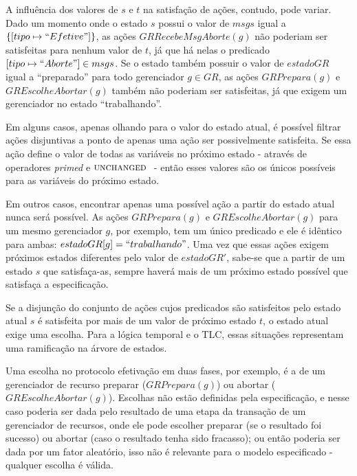 A influência dos valores de $s$ e $t$ na satisfação de ações, contudo, pode
variar. Dado um momento onde o estado $s$ possui o valor de $msgs$ igual a
$\{[tipo \mapsto ``Efetive"]\}$, as ações $GRRecebeMsgAborte(g)$ não poderiam ser
satisfeitas para nenhum valor de $t$, já que há nelas o predicado $[tipo \mapsto
``Aborte"] \in msgs$. Se o estado também possuir o valor de
$estadoGR$ igual a ``preparado'' para todo gerenciador $g \in GR$, as ações
$GRPrepara(g)$ e $GREscolheAbortar(g)$ também não poderiam ser satisfeitas, já
que exigem um gerenciador no estado ``trabalhando''.

Em alguns casos, apenas olhando para o valor do estado atual, é possível filtrar
ações disjuntivas a ponto de apenas uma ação ser possivelmente satisfeita. Se
essa ação define o valor de todas as variáveis no próximo estado - através de
operadores \textit{primed} e $\textsc{unchanged }$ - então esses valores são os únicos
possíveis para as variáveis do próximo estado.

Em outros casos, encontrar apenas uma possível ação a partir do estado atual nunca será possível. As
ações $GRPrepara(g)$ e $GREscolheAbortar(g)$ para um mesmo gerenciador $g$, por
exemplo, tem um único predicado e ele é idêntico para ambas: $estadoGR[g] =
``trabalhando"$. Uma vez que essas ações exigem próximos estados diferentes pelo
valor de $estadoGR'$, sabe-se que a partir de um estado $s$ que satisfaça-as,
sempre haverá mais de um próximo estado possível que satisfaça a especificação.

Se a disjunção do conjunto de ações cujos predicados são satisfeitos pelo estado
atual $s$ é satisfeita por mais de um valor de próximo estado $t$, o estado
atual exige uma escolha. Para a lógica temporal e o TLC, essas situações representam uma ramificação
na árvore de estados.

Uma escolha no protocolo efetivação em duas fases, por exemplo, é a de um
gerenciador de recurso preparar ($GRPrepara(g)$) ou abortar ($GREscolheAbortar(g)$).
Escolhas não estão definidas pela especificação, e nesse caso poderia ser dada pelo
resultado de uma etapa da transação de um gerenciador de recursos, onde ele pode
escolher preparar (se o resultado foi sucesso) ou abortar (caso o resultado
tenha sido fracasso); ou então poderia ser dada por um fator aleatório, isso não
é relevante para o modelo especificado - qualquer escolha é válida.



